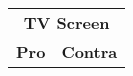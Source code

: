 \begin{tabular}{ll}
\multicolumn{2}{c}{\textbf{TV Screen}}                                                                                                                                                                                                                                                                                                                                                                                                                                                                                                                                                                                                                                                                                                                                                                                                                                                                                \\
\textbf{Pro}                                                                                                                                                                                                                                                                                                                                                                                                         & \textbf{Contra}                                                                                                                                                                                                                                                                                                                                                                                                                                                                                \\

\end{tabular}
